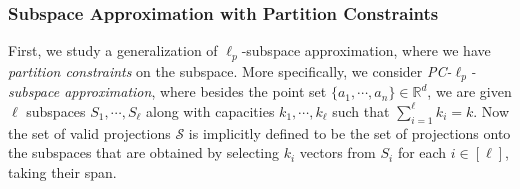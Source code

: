 \documentclass[11pt]{article}
\theoremstyle{plain}
\theoremstyle{plain}
\theoremstyle{definition}
\theoremstyle{plain}
\theoremstyle{remark}
\DeclareRobustCommand{\fairSAp}[1]{PC-$\ell_{#1}$-subspace approximation}
\begin{document}
\subsubsection{Subspace Approximation with Partition Constraints} 

First, we study a generalization of $\ell_p$-subspace approximation, where we have {\em partition constraints} on the subspace. 
More specifically, we consider {\em\fairSAp{p}}, where besides the point set $\{a_1,\cdots, a_n\}\in\mathbb{R}^d$, we are given $\ell$ subspaces $S_1, \cdots, S_\ell$ along with capacities $k_1, \cdots, k_\ell$ such that $\sum_{i=1}^\ell k_i = k$. Now the set of valid projections $\mathcal{S}$ is implicitly defined to be the set of projections onto the subspaces that are obtained by selecting $k_i$ vectors from $S_i$ for each $i\in [\ell]$, taking their span.
\end{document}
